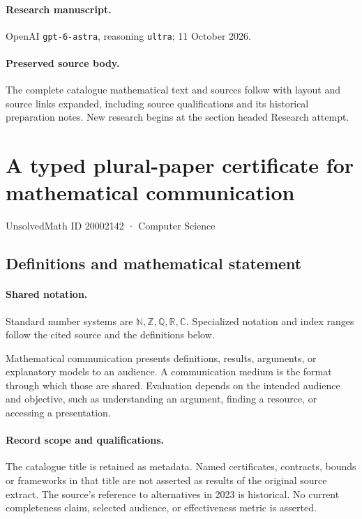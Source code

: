\documentclass[11pt]{article}
\begin{document}
\paragraph{Research manuscript.} OpenAI \texttt{gpt-6-astra}, reasoning \texttt{ultra}; 11 October 2026.
\paragraph{Preserved source body.} The complete catalogue mathematical text and sources follow with layout and source links expanded, including source qualifications and its historical preparation notes. New research begins at the section headed Research attempt.

\section{A typed plural-paper certificate for mathematical communication}\label{20002142}
{\small UnsolvedMath ID 20002142 · Computer Science}
\subsection{Definitions and mathematical statement}

\paragraph{Shared notation.}Standard number systems are $\mathbb N,\mathbb Z,\mathbb Q,\mathbb R,\mathbb C$. Specialized notation and index ranges follow the cited source and the definitions below.


Mathematical communication presents definitions, results, arguments, or explanatory models to an audience. A communication medium is the format through which those are shared. Evaluation depends on the intended audience and objective, such as understanding an argument, finding a resource, or accessing a presentation.
\paragraph{Record scope and qualifications.}
The catalogue title is retained as metadata. Named certificates, contracts, bounds or frameworks in that title are not asserted as results of the original source extract.
The source's reference to alternatives in 2023 is historical. No current completeness claim, selected audience, or effectiveness metric is asserted.
\end{document}
